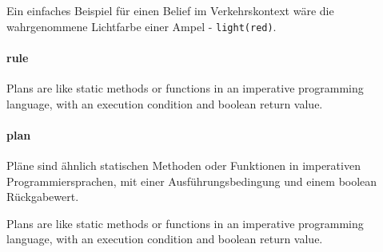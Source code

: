 Ein einfaches Beispiel für einen Belief im Verkehrskontext wäre die wahrgenommene Lichtfarbe einer Ampel - \texttt{light(red)}.

\paragraph*{rule}
Plans are like static methods or functions in an imperative programming language, with an execution condition and boolean return value.

\paragraph*{plan}
Pläne sind ähnlich statischen Methoden oder Funktionen in imperativen Programmiersprachen, mit einer Ausführungsbedingung und einem boolean Rückgabewert.

Plans are like static methods or functions in an imperative programming language, with an execution condition and boolean return value.